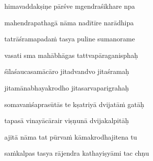 himavaddakṣiṇe pārśve mgendraśikhare npa\thinspace{\dandab} \dontdisplaylinenum

mahendrapathagā nāma nadītīre narādhipa \veg\dontdisplaylinenum
{}

tatrāśramapadaṁ tasya puline sumanorame\thinspace{\dandab} \dontdisplaylinenum

vasati sma mahābhāgas tattvapāraganisphaḥ \veg\dontdisplaylinenum
{}

śīlaśaucasamācāro jitadvandvo jitaśramaḥ\thinspace{\dandab} \dontdisplaylinenum

jitamānabhayakrodho jitasarvaparigrahaḥ \veg\dontdisplaylinenum
{}

somavaṁśaprasūtās te kṣatriyā dvijatāṁ gatāḥ\thinspace{\dandab} \dontdisplaylinenum

tapasā vinayācārair viṣṇunā dvijakalpitāḥ \veg\dontdisplaylinenum
{}

ajitā nāma tat pūrvaṁ kāmakrodhajitena tu\thinspace{\dandab} \dontdisplaylinenum

saṁkalpas tasya rājendra kathayiṣyāmi tac chṇu \veg\dontdisplaylinenum
{}

